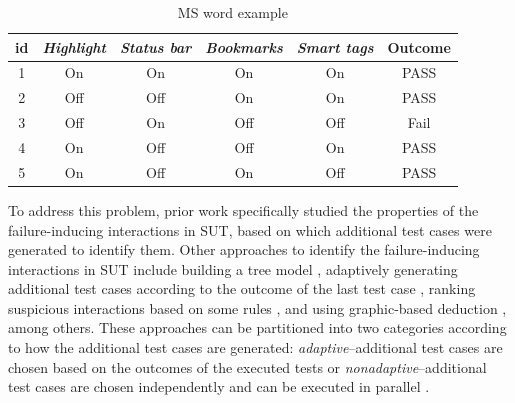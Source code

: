 \begin{table}
\caption{MS word example} \centering
  \label{MS_word}
  \setlength{\tabcolsep}{3pt}
  \begin{tabular}{c|cccc|c}\hline
id& \emph{Highlight} & \emph{Status bar} & \emph{Bookmarks}& \emph{Smart tags} & \bfseries{Outcome} \\\hline
1& On & On & On& On & PASS\\ \hline
2& Off & Off & On & On & PASS\\ \hline
3&Off&	On&	Off&Off & Fail\\ \hline
4&On & Off & Off &On&  PASS\\ \hline
5&On & Off &On & Off&  PASS\\ \hline
  \end{tabular}
\end{table}

To address this problem, prior work \cite{nie2011minimal} specifically studied the properties of the failure-inducing interactions in SUT, based on which additional test cases were generated to identify them. Other approaches to identify the failure-inducing interactions in SUT include building a tree model \cite{yilmaz2006covering}, adaptively generating additional test cases according to the outcome of the last test case \cite{zhang2011characterizing}, ranking suspicious interactions based on some rules \cite{ghandehari2012identifying}, and using graphic-based deduction \cite{martinez2008algorithms}, among others. These approaches can be partitioned into two categories \cite{colbourn2008locating} according to how the additional test cases are generated: \emph{adaptive}--additional test cases are chosen based on the outcomes of the executed tests \cite{shi2005software,nie2011minimal,ghandehari2012identifying,niu2013identifying,zhang2011characterizing,shakya2012isolating,wang2010adaptive,li2012improved}or \emph{nonadaptive}--additional test cases are chosen independently and can be executed in parallel \cite{yilmaz2006covering,colbourn2008locating,martinez2008algorithms,martinez2009locating,zhang2012faulty}.

